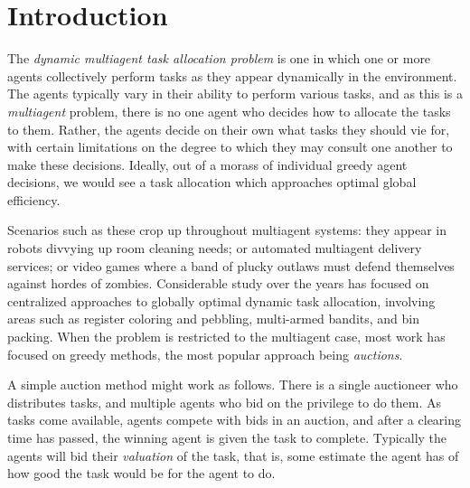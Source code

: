 \documentclass[letterpaper]{aamas2015}
\begin{document}









\section{Introduction} 

The {\it dynamic multiagent task allocation problem} is one in which one or more agents collectively perform tasks as they appear dynamically in the environment.  The agents typically vary in their ability to perform various tasks, and as this is a {\it multiagent} problem, there is no one agent who decides how to allocate the tasks to them.  Rather, the agents decide on their own what tasks they should vie for, with certain limitations on the degree to which they may consult one another to make these decisions.   Ideally, out of a morass of individual greedy agent decisions, we would see a task allocation which approaches optimal global efficiency.

Scenarios such as these crop up throughout multiagent systems: they appear in robots divvying up room cleaning needs; or automated multiagent delivery services; or video games where a band of plucky outlaws must defend themselves against hordes of zombies.  Considerable study over the years has focused on centralized approaches to globally optimal dynamic task allocation, involving areas such as register coloring and pebbling, multi-armed bandits, and bin packing.  When the problem is restricted to the multiagent case, most work has focused on greedy methods, the most popular approach being  {\it auctions}.

A simple auction method might work as follows.  There is a single auctioneer who distributes tasks, and multiple agents who bid on the privilege to do them.  As tasks come available, agents compete with bids in an auction, and after a clearing time has passed, the winning agent is given the task to complete.  Typically the agents will bid their {\it valuation} of the task, that is, some estimate the agent has of how good the task would be for the agent to do.
\end{document}
